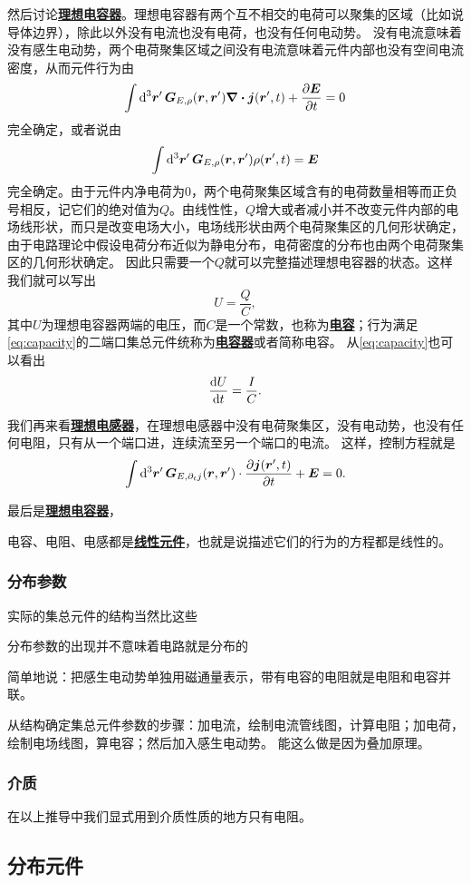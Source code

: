 \documentclass[UTF8, a4paper]{ctexart}
\newcommand*{\concept}[1]{\underline{\textbf{#1}}}
\begin{document}
然后讨论\concept{理想电容器}。理想电容器有两个互不相交的电荷可以聚集的区域（比如说导体边界），除此以外没有电流也没有电荷，也没有任何电动势。
没有电流意味着没有感生电动势，两个电荷聚集区域之间没有电流意味着元件内部也没有空间电流密度，从而元件行为由
\[
    \int \dd[3]{\vb*{r}'} \vb*{G}_{E, \rho}(\vb*{r}, \vb*{r}') \div{\vb*{j}}(\vb*{r}', t) + \pdv{\vb*{E}}{t} = 0
\]
完全确定，或者说由
\[
    \int \dd[3]{\vb*{r}'} \vb*{G}_{E, \rho}(\vb*{r}, \vb*{r}') \rho(\vb*{r}', t) = \vb*{E}
\]
完全确定。由于元件内净电荷为0，两个电荷聚集区域含有的电荷数量相等而正负号相反，记它们的绝对值为$Q$。由线性性，$Q$增大或者减小并不改变元件内部的电场线形状，而只是改变电场大小，电场线形状由两个电荷聚集区的几何形状确定，由于电路理论中假设电荷分布近似为静电分布，电荷密度的分布也由两个电荷聚集区的几何形状确定。
因此只需要一个$Q$就可以完整描述理想电容器的状态。这样我们就可以写出
\begin{equation}
    U = \frac{Q}{C},
    \label{eq:capacity}
\end{equation}
其中$U$为理想电容器两端的电压，而$C$是一个常数，也称为\concept{电容}；行为满足\eqref{eq:capacity}的二端口集总元件统称为\concept{电容器}或者简称电容。
从\eqref{eq:capacity}也可以看出
\[
    \dv{U}{t} = \frac{I}{C}.
\]

我们再来看\concept{理想电感器}，在理想电感器中没有电荷聚集区，没有电动势，也没有任何电阻，只有从一个端口进，连续流至另一个端口的电流。
这样，控制方程就是
\[
    \int \dd[3]{\vb*{r}'} \vb*{G}_{E, \partial_t j}(\vb*{r}, \vb*{r}') \cdot \pdv{\vb*{j}(\vb*{r}', t)}{t} + \vb*{E} = 0.
\]

最后是\concept{理想电容器}，

电容、电阻、电感都是\concept{线性元件}，也就是说描述它们的行为的方程都是线性的。

\subsubsection{分布参数}

实际的集总元件的结构当然比这些

分布参数的出现并不意味着电路就是分布的

简单地说：把感生电动势单独用磁通量表示，带有电容的电阻就是电阻和电容并联。

从结构确定集总元件参数的步骤：加电流，绘制电流管线图，计算电阻；加电荷，绘制电场线图，算电容；然后加入感生电动势。
能这么做是因为叠加原理。

\subsubsection{介质}

在以上推导中我们显式用到介质性质的地方只有电阻。

\subsection{分布元件}

\end{document}
